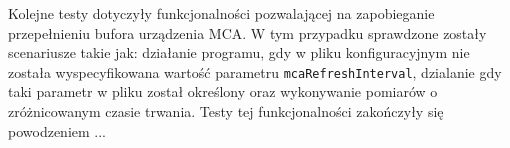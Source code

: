 


Kolejne testy dotyczyły funkcjonalności pozwalającej na zapobieganie przepełnieniu bufora urządzenia MCA. W tym przypadku sprawdzone zostały scenariusze takie jak: działanie programu, gdy w pliku konfiguracyjnym nie została wyspecyfikowana wartość parametru \lstinline{mcaRefreshInterval}, dzialanie gdy taki parametr w pliku został określony oraz wykonywanie pomiarów o zróżnicowanym czasie trwania. Testy tej funkcjonalności zakończyły się powodzeniem ...



